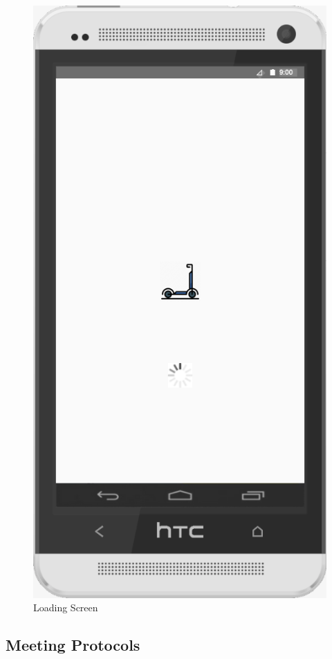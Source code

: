 \documentclass[a4paper, 12pt]{article}
\begin{document}
\begin{figure} [htbp]
  \begin{center}
    \includegraphics[scale=0.5]{images/prototypes/06-loading-screen.png}
  \end{center}
  \caption{Loading Screen}
\end{figure}

\newpage
\subsection{Meeting Protocols}
\end{document}
